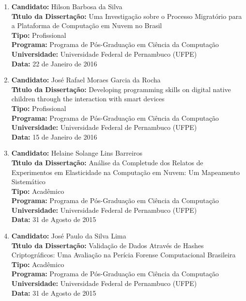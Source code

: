 \documentclass[a4paper,oneside,10pt]{article}
\begin{document}
\begin{enumerate}
\item       \textbf{Candidato:} Hilson Barbosa da Silva \mbox{}\\
            \textbf{T\'{\i}tulo da Disserta\c{c}\~{a}o:} Uma Investigação sobre o Processo Migratório para a Plataforma de Computação em Nuvem no Brasil\\
            \textbf{Tipo:} Profissional\\
            \textbf{Programa:} Programa de Pós-Graduação em Ciência da Computação\\
            \textbf{Universidade:} Universidade Federal de Pernambuco (UFPE)\\
            \textbf{Data:} 22 de Janeiro de 2016

\item       \textbf{Candidato:} José Rafael Moraes Garcia da Rocha \mbox{}\\
            \textbf{T\'{\i}tulo da Disserta\c{c}\~{a}o:} Developing programming skills on digital native children through the interaction with smart devices\\
            \textbf{Tipo:} Profissional\\
            \textbf{Programa:} Programa de Pós-Graduação em Ciência da Computação\\
            \textbf{Universidade:} Universidade Federal de Pernambuco (UFPE)\\
            \textbf{Data:} 15 de Janeiro de 2016

\item       \textbf{Candidato:} Helaine Solange Lins Barreiros \mbox{} \\
            \textbf{T\'{\i}tulo da Disserta\c{c}\~{a}o:} Análise da Completude dos Relatos de Experimentos em Elasticidade na Computação em Nuvem: Um Mapeamento Sistemático\\
            \textbf{Tipo:} Acadêmico\\
            \textbf{Programa:} Programa de Pós-Graduação em Ciência da Computação\\
            \textbf{Universidade:} Universidade Federal de Pernambuco (UFPE)\\
            \textbf{Data:} 31 de Agosto de 2015

\item       \textbf{Candidato:} José Paulo da Silva Lima \mbox{} \\
            \textbf{T\'{\i}tulo da Disserta\c{c}\~{a}o:} Validação de Dados Através de Hashes Criptográficos: Uma Avaliação na Perícia Forense Computacional Brasileira\\
            \textbf{Tipo:} Acadêmico\\
            \textbf{Programa:} Programa de Pós-Graduação em Ciência da Computação\\
            \textbf{Universidade:} Universidade Federal de Pernambuco (UFPE)\\
            \textbf{Data:} 31 de Agosto de 2015


\end{enumerate}
\end{document}
